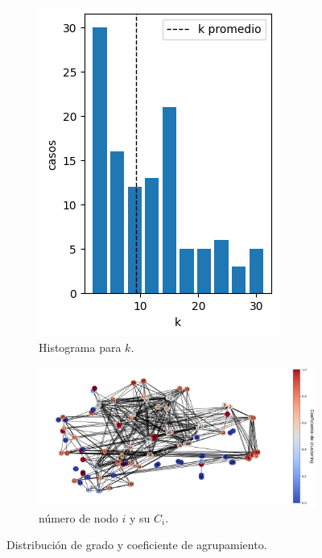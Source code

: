 \documentclass{article}
\begin{document}
\begin{figure}[ht]
	\centering
	\begin{subfigure}[b]{0.25\textwidth}
		\includegraphics[width= \linewidth]{histograma_k}
		\caption{Histograma para $k$.
		}
		\label{fg:hist_k}
	\end{subfigure}
	\begin{subfigure}[b]{0.7\textwidth}
		\includegraphics[width= \linewidth]{clustering}
		\caption{número de nodo $i$ y su $C_i$.
		}
		\label{fg:clustering}
	\end{subfigure}
	\caption{Distribución de grado y coeficiente de agrupamiento.
	}
	\label{fg:distribución_de_grado}
\end{figure}
\end{document}
